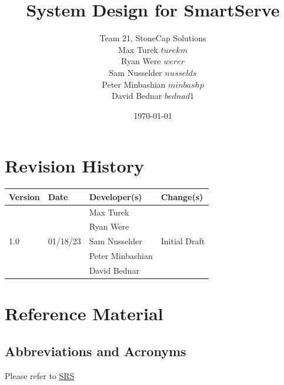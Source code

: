 \documentclass[12pt, titlepage]{article}
\newcommand{\progname}{SmartServe} %
\newcommand{\authname}{Team 21, StoneCap Solutions
\\ Max Turek $turekm$
\\ Ryan Were $werer$
\\ Sam Nusselder $nusselds$
\\ Peter Minbashian $minbashp$
\\ David Bednar $bednad1$} %
\begin{document}
\title{System Design for \progname{}} 
\author{\authname}
\date{\today}

\maketitle


\section{Revision History}

\begin{tabularx}{\textwidth}{| s | s | s | X |}
        \toprule
        \textbf{Version} & \textbf{Date} & \textbf{Developer(s)} & \textbf{Change(s)}\\
        \midrule
         & & Max Turek & \\
         & & Ryan Were & \\
        1.0 & 01/18/23 & Sam Nusselder & Initial Draft\\
         & & Peter Minbashian & \\ 
         & & David Bednar & \\ 
        \bottomrule
        \hline
\end{tabularx}

\newpage

\section{Reference Material}

\subsection{Abbreviations and Acronyms}
Please refer to \href{https://github.com/purefisher/Smart-Serve/blob/main/docs/SRS/SRS.pdf}{SRS} 

\newpage

\tableofcontents

\newpage
\end{document}
